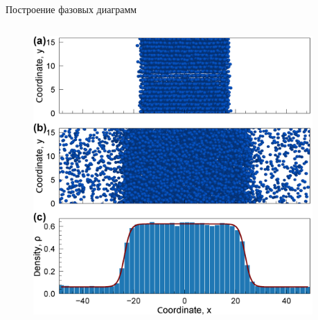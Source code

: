 \documentclass{beamer}
\begin{document}
\begin{frame}{Построение фазовых диаграмм}
\footnotesize{



\begin{columns}
\begin{column}{0.55\linewidth}

\vspace{0.5cm}
\begin{figure}
    \centering
    \href{run:video_flat_layer.mp4}{\includegraphics[width=\textwidth]{MACR-Figure0.png}}
\end{figure}


\end{column}

\begin{column}{0.48\linewidth}


\end{column}
\end{columns}}
\end{frame}
\end{document}
